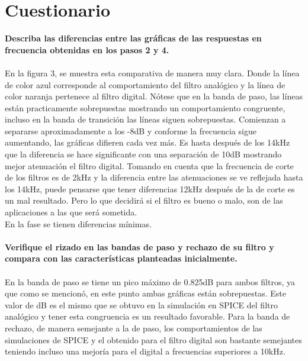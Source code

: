 \documentclass[12pt]{article}
\begin{document}
\section{Cuestionario}
\textbf{Describa las diferencias entre las gráficas de las respuestas en frecuencia obtenidas en los pasos 2 y 4.}
\\
\\
En la figura 3, se muestra esta comparativa de manera muy clara. Donde la línea de color azul corresponde al comportamiento del filtro analógico y la línea de color naranja pertenece al filtro digital. Nótese que en la banda de paso, las líneas están practicamente sobrepuestas mostrando un comportamiento congruente, incluso en la banda de transición las líneas siguen sobrepuestas. Comienzan a separarse aproximadamente a los -8dB y conforme la frecuencia sigue aumentando, las gráficas difieren cada vez más. Es hasta después de los 14kHz que la diferencia se hace significante con una separación de 10dB mostrando mejor atenuación el filtro digital. Tomando en cuenta que la frecuencia de corte de los filtros es de 2kHz y la diferencia entre las atenuaciones se ve reflejada hasta los 14kHz, puede pensarse que tener diferencias 12kHz después de la de corte es un mal resultado. Pero lo que decidirá si el filtro es bueno o malo, son de las aplicaciones a las que será sometida.
\\
En la fase se tienen diferencias mínimas. 
\\
\\
\textbf{Verifique el rizado en las bandas de paso y rechazo de su filtro y compara con las características planteadas inicialmente.}
\\
\\
En la banda de paso se tiene un pico máximo de 0.825dB para ambos filtros, ya que como se mencionó, en este punto ambas gráficas están sobrepuestas. Este valor de dB es el mismo que se obtuvo en la simulación en SPICE del filtro analógico y tener esta congruencia es un resultado favorable. Para la banda de rechazo, de manera semejante a la de paso, los comportamientos de las simulaciones de SPICE y el obtenido para el filtro digital son bastante semejantes teniendo incluso una mejoría para el digital a frecuencias superiores a 10kHz.
\\
\\
\end{document}
